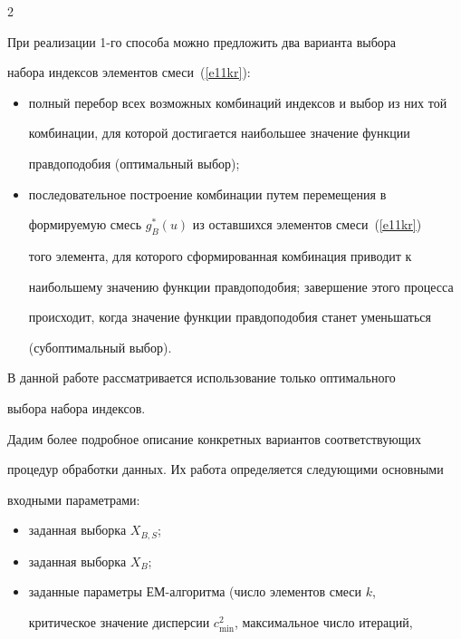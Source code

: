 \begin{multicols}{2}
     


     При реализации 1-го способа можно предложить два варианта выбора 


набора индексов элементов смеси~(\ref{e11kr}):


     \begin{itemize}


\item полный перебор всех возможных комбинаций индексов и выбор из них той 


комбинации, для которой достигается наибольшее значение функции 


правдоподобия (оптимальный выбор); 


\item последовательное построение комбинации путем перемещения в 


формируемую смесь $g_B^*(u)$ из оставшихся элементов смеси~(\ref{e11kr}) 


того элемента, для которого сформированная комби\-нация приводит к 


наибольшему значению функции правдоподобия; завершение этого процесса 


происходит, когда значение функции правдоподобия станет уменьшаться 


(субоптимальный выбор). 


\end{itemize}


     


     В данной работе рассматривается использование только оптимального 


выбора набора индексов.


     


     Дадим более подробное описание конкретных вариантов соответствующих 


процедур обработки данных. Их работа определяется следующими основными 


входными параметрами: 


     \begin{itemize}


\item заданная выборка $X_{B,S}$;


\item заданная выборка $X_B$;


\item заданные параметры ЕМ-алгоритма (число элементов смеси $k$, 


критическое значение дисперсии $c^2_{\min}$, максимальное число итераций, 



\end{itemize}
\end{multicols}
